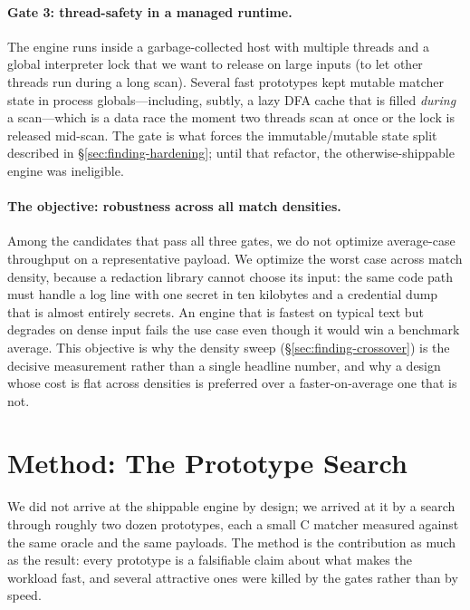 \documentclass[acmsmall,nonacm,screen]{acmart}
\begin{document}
\paragraph{Gate 3: thread-safety in a managed runtime.} The engine runs inside a
garbage-collected host with multiple threads and a global interpreter lock that we
want to release on large inputs (to let other threads run during a long scan).
Several fast prototypes kept mutable matcher state in process globals---including,
subtly, a lazy DFA cache that is filled \emph{during} a scan---which is a data
race the moment two threads scan at once or the lock is released mid-scan. The
gate is what forces the immutable/mutable state split described in
\S\ref{sec:finding-hardening}; until that refactor, the otherwise-shippable engine
was ineligible.

\paragraph{The objective: robustness across all match densities.} Among the
candidates that pass all three gates, we do not optimize average-case throughput
on a representative payload. We optimize the worst case across match
density, because a redaction library cannot choose its input: the same code path
must handle a log line with one secret in ten kilobytes and a credential dump that
is almost entirely secrets. An engine that is fastest on typical text but degrades
on dense input fails the use case even though it would win a benchmark average.
This objective is why the density sweep (\S\ref{sec:finding-crossover}) is the
decisive measurement rather than a single headline number, and why a design whose
cost is flat across densities is preferred over a faster-on-average one that is
not.

\section{Method: The Prototype Search}
\label{sec:method}
We did not arrive at the shippable engine by design; we arrived at it by a search
through roughly two dozen prototypes, each a small C matcher measured against the
same oracle and the same payloads. The method is the contribution as much as the
result: every prototype is a falsifiable claim about what makes the workload fast,
and several attractive ones were killed by the gates rather than by speed.
\end{document}
